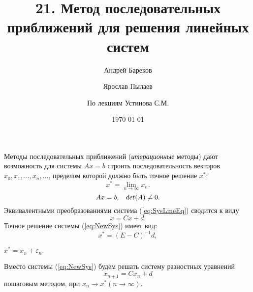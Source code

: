 \documentclass[a4paper,11pt]{article}
\title{21. Метод последовательных приближений для решения линейных систем}
\author{Андрей Бареков \and Ярослав Пылаев \and По лекциям Устинова С.М.}
\date{\today}
\begin{document}
\maketitle
\newpage

\noindent Методы последовательных приближений (\textit{итерационные} методы) дают возможность для системы $Ax=b$ строить последовательность
векторов $x_0, x_1, \dots, x_n, \dots$, пределом которой должно быть точное решение $x^*$: \[x^*=\lim_{n\rightarrow\infty}x_n.\]
\begin{equation}
  Ax = b, \hspace{3mm} det(A) \ne 0.
  \label{eq:SysLineEq}
\end{equation}
Эквивалентными преобразованиями система (\ref{eq:SysLineEq}) сводится к виду
\begin{equation}
  x = Cx+d.
  \label{eq:NewSys}
\end{equation}
Точное решение системы (\ref{eq:NewSys}) имеет вид:
\begin{equation}
  x^* = (E-C)^{-1}d,
  \label{eq:AccurateSole}
\end{equation}
\begin{center}
  $x^* = x_n+\varepsilon_n.$
\end{center}
Вместо системы (\ref{eq:NewSys}) будем решать систему разностных уравнений
\begin{equation}
  x_{n+1} = Cx_n+d
  \label{eq:DiffEq}
\end{equation}
пошаговым методом, при $x_n \rightarrow x^* (n \rightarrow \infty)$.\\
\end{document}
